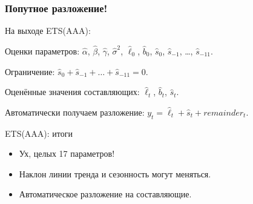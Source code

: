 \begin{frame}
  \frametitle{Попутное разложение!}

  На выходе ETS(AAA):

  \alert{Оценки параметров}:  $\hat\alpha$, $\hat\beta$, $\hat\gamma$, $\hat\sigma^2$, $\hat\ell_0$, $\hat b_0$, 
  $\hat s_0$, $\hat s_{-1}$, \ldots, $\hat s_{-11}$.

  Ограничение: $\hat s_0 + \hat s_{-1} + \ldots + \hat s_{-11} = 0$.

  \pause 
  Оценённые \alert{значения составляющих}: $\hat \ell_t$, $\hat b_t$, $\hat s_t$.

  \pause 
  Автоматически получаем \alert{разложение}: $y_t = \hat \ell_t + \hat s_t + remainder_t$.

\end{frame}


\begin{frame}{ETS(AAA): итоги}

  \begin{itemize}[<+->]
    \item Ух, целых 17 параметров! 
    \item Наклон линии тренда и сезонность могут меняться.
    \item Автоматическое разложение на составляющие.
  \end{itemize}
\end{frame}



